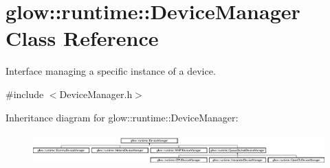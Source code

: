 \hypertarget{classglow_1_1runtime_1_1_device_manager}{}\section{glow\+:\+:runtime\+:\+:Device\+Manager Class Reference}
\label{classglow_1_1runtime_1_1_device_manager}


Interface managing a specific instance of a device.  




{\ttfamily \#include $<$Device\+Manager.\+h$>$}

Inheritance diagram for glow\+:\+:runtime\+:\+:Device\+Manager\+:\begin{figure}[H]
\begin{center}
\leavevmode
\includegraphics[height=1.244444cm]{classglow_1_1runtime_1_1_device_manager}
\end{center}
\end{figure}
